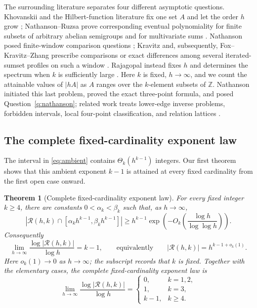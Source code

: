 \documentclass[11pt,reqno]{amsart}
\newtheorem{theorem}{Theorem}[section]
\theoremstyle{definition}
\theoremstyle{remark}
\newcommand{\Rcal}{\mathcal R}
\begin{document}
The surrounding literature separates four different asymptotic questions.
Khovanskii and the Hilbert-function literature fix one set $A$ and let the
order $h$ grow \cite{Khovanskii1992,Khovanskii1995,EliahouMazumdar2022};
Nathanson--Ruzsa prove corresponding eventual polynomiality for finite
subsets of arbitrary abelian semigroups and for multivariate sums
\cite{NathansonRuzsa2002}.  Nathanson posed finite-window comparison questions
\cite{NathansonInverse2026}; Kravitz and, subsequently,
Fox--Kravitz--Zhang prescribe comparisons or exact differences among several
iterated-sumset profiles on such a window
\cite{Kravitz2025,FoxKravitzZhang2026}.  Rajagopal instead fixes $h$ and
determines the spectrum when $k$ is sufficiently large
\cite{Rajagopal2026}.  Here $k$ is fixed, $h\to\infty$, and we count the
attainable values of $|hA|$ as $A$ ranges over the $k$-element subsets of
$\mathbb Z$.  Nathanson
initiated this last problem, proved the exact three-point formula, and posed
Question~\ref{q:nathanson}; related work treats lower-edge inverse problems,
forbidden intervals, local four-point classification, and relation lattices
\cite{NathansonProblems,NathansonExplicit2025,NathansonTriangular,
TangXing2021,MohanPandey2023,Schinina2026,Jung2026,OBryant2025}.

\subsection*{The complete fixed-cardinality exponent law}

The interval in \eqref{eq:ambient} contains $\Theta_k(h^{k-1})$ integers.
Our first theorem shows that this ambient exponent $k-1$ is attained at
every fixed cardinality from the first open case onward.

\begin{theorem}[Complete fixed-cardinality exponent law]
\label{thm:endpoint-spectrum}
For every fixed integer $k\geq4$, there are constants
$0<\alpha_k<\beta_k$ such that, as $h\to\infty$,
\begin{equation}\label{eq:endpoint-local}
 \left|\Rcal(h,k)\cap
 [\alpha_kh^{k-1},\beta_kh^{k-1}]\right|
 \geq
 h^{k-1}\exp\!\left(
  -O_k\!\left(\frac{\log h}{\log\log h}\right)\right).
\end{equation}
Consequently
\begin{equation}\label{eq:ambient-exponent}
 \lim_{h\to\infty}\frac{\log|\Rcal(h,k)|}{\log h}=k-1,
 \qquad\text{equivalently}\qquad
 |\Rcal(h,k)|=h^{k-1+o_k(1)}.
\end{equation}
Here $o_k(1)\to0$ as $h\to\infty$; the subscript records that $k$ is fixed.
Together with the elementary cases, the complete fixed-cardinality exponent
law is
\begin{equation}\label{eq:phase-diagram}
 \lim_{h\to\infty}\frac{\log|\Rcal(h,k)|}{\log h}=
 \begin{cases}
  0,&k=1,2,\\
  1,&k=3,\\
  k-1,&k\geq4.
 \end{cases}
\end{equation}
\end{theorem}
\end{document}
